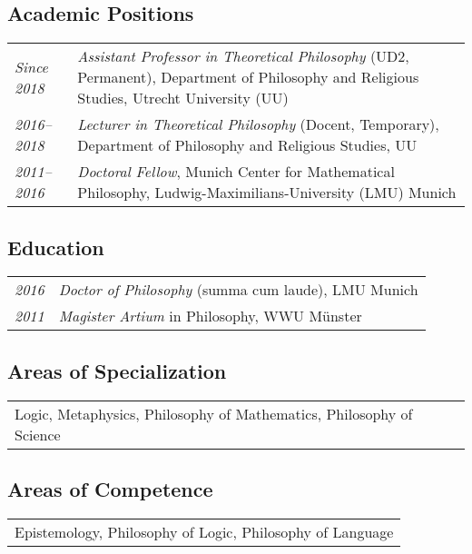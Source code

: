 \subsection*{Academic Positions}

\begin{tabular}{l p{.8\linewidth}}
  \emph{Since 2018} & \emph{Assistant Professor in Theoretical
                      Philosophy} (UD2, Permanent), Department of
                      Philosophy and Religious Studies, Utrecht
                      University (UU)\\[1ex]
  \emph{2016--2018} & \emph{Lecturer in Theoretical Philosophy} (Docent,
                      Temporary), Department of Philosophy and Religious
                      Studies, UU\\[1ex]
  \emph{2011--2016} & \emph{Doctoral Fellow}, Munich Center for
                      Mathematical Philosophy,
                      Ludwig-Maximilians-University (LMU) Munich\\
\end{tabular}

\subsection*{Education}

\begin{tabular}{l p{.8\linewidth}}
  \emph{2016} & \emph{Doctor of Philosophy} (summa cum laude), LMU
                Munich\\[1ex]
  \emph{2011} & \emph{Magister Artium} in Philosophy, WWU M\"unster\\
\end{tabular}

\subsection*{Areas of Specialization}

\begin{tabular}{l}
  Logic, Metaphysics, Philosophy of Mathematics, Philosophy of Science
\end{tabular}

\subsection*{Areas of Competence}

\begin{tabular}{l}
  Epistemology, Philosophy of Logic, Philosophy of Language
\end{tabular}

